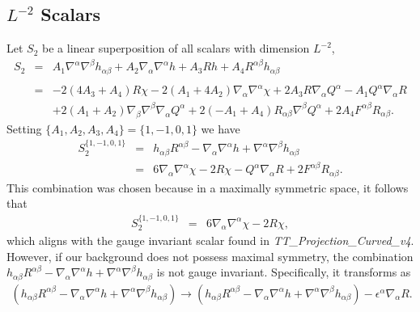 \documentclass[10pt,letterpaper]{article}
\numberwithin{equation}{section}
\begin{document}
\subsection{$L^{-2}$ Scalars}
%
Let $S_2$ be a linear superposition of all scalars with dimension $L^{-2}$,
\begin{eqnarray}
S_2 &=& A_1 \nabla^\alpha\nabla^\beta h_{\alpha\beta} + A_2 \nabla_\alpha\nabla^\alpha h + A_3 Rh + A_4 R^{\alpha\beta}h_{\alpha\beta}
\\ \nonumber\\
&=&  -2 (4 A_{3}{} + A_{4}{}) R \chi - 2 (A_{1}{} + 4 A_{2}{}) \nabla_{\alpha }\nabla^{\alpha }\chi +2 A_{3}{} R \nabla_{\alpha }Q^{\alpha } -  A_{1}{} Q^{\alpha } \nabla_{\alpha }R \nonumber \\ 
&& + 2 (A_{1}{} + A_{2}{}) \nabla_{\beta }\nabla^{\beta }\nabla_{\alpha }Q^{\alpha } + 2 (- A_{1}{} + A_{4}{}) R_{\alpha \beta } \nabla^{\beta }Q^{\alpha }+2 A_{4}{} F^{\alpha \beta } R_{\alpha \beta }.
\label{S2}
\end{eqnarray}
Setting $\{A_1,A_2,A_3,A_4\} = \{1,-1,0,1\}$ we have
\begin{eqnarray}
S_2^{ \{1,-1,0,1\}} &=&  h_{\alpha \beta } R^{\alpha \beta } -  \nabla_{\alpha }\nabla^{\alpha }h + \nabla^{\alpha }\nabla^{\beta }h_{\alpha \beta }
\\ \nonumber
&=& 6 \nabla_{\alpha }\nabla^{\alpha }\chi -2 R \chi - Q^{\alpha } \nabla_{\alpha }R+2 F^{\alpha \beta } R_{\alpha \beta }.
\end{eqnarray}
This combination was chosen because in a maximally symmetric space, it follows that
\begin{eqnarray}
S_2^{ \{1,-1,0,1\}} &=& 6 \nabla_{\alpha }\nabla^{\alpha }\chi -2 R \chi,
\end{eqnarray}
which aligns with the gauge invariant scalar found in \emph{TT\_Projection\_Curved\_v4}. However, if our background does not possess maximal symmetry, the combination $h_{\alpha \beta } R^{\alpha \beta } -  \nabla_{\alpha }\nabla^{\alpha }h + \nabla^{\alpha }\nabla^{\beta }h_{\alpha \beta }$ is not gauge invariant. Specifically, it transforms as 
\begin{eqnarray}
(h_{\alpha \beta } R^{\alpha \beta } -  \nabla_{\alpha }\nabla^{\alpha }h + \nabla^{\alpha }\nabla^{\beta }h_{\alpha \beta }) \to (h_{\alpha \beta } R^{\alpha \beta } -  \nabla_{\alpha }\nabla^{\alpha }h + \nabla^{\alpha }\nabla^{\beta }h_{\alpha \beta }) - \epsilon^{\alpha } \nabla_{\alpha }R.
\end{eqnarray}
\end{document}
